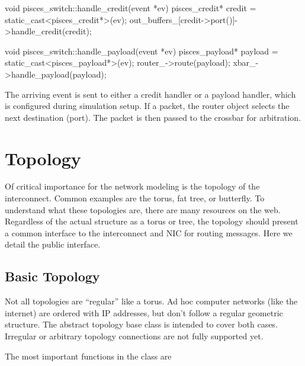 \begin{CppCode}
void
pisces_switch::handle_credit(event *ev)
{
  pisces_credit* credit = static_cast<pisces_credit*>(ev);
  out_buffers_[credit->port()]->handle_credit(credit);
}

void
pisces_switch::handle_payload(event *ev)
{
  pisces_payload* payload = static_cast<pisces_payload*>(ev);
  router_->route(payload);
  xbar_->handle_payload(payload);
}
\end{CppCode}
The arriving event is sent to either a credit handler or a payload handler,
which is configured during simulation setup.
If a packet, the router object selects the next destination (port).
The packet is then passed to the crossbar for arbitration.

\section{Topology}
\label{sec:topology}
Of critical importance for the network modeling is the topology of the interconnect.
Common examples are the torus, fat tree, or butterfly.
To understand what these topologies are, there are many resources on the web.
Regardless of the actual structure as a torus or tree, the topology should present a common interface to the interconnect and NIC for routing messages.
Here we detail the public interface.
\subsection{Basic Topology}
Not all topologies are ``regular'' like a torus.  Ad hoc computer networks (like the internet) are ordered with IP addresses, but don't follow a regular geometric structure.
The abstract topology base class is intended to cover both cases.
Irregular or arbitrary topology connections are not fully supported yet.

The most important functions in the \topcls class are

